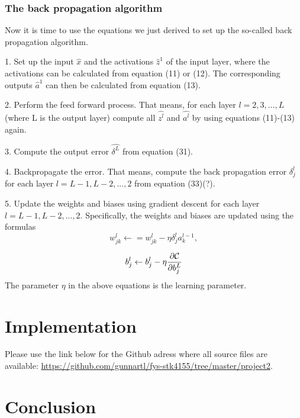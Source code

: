 \documentclass[a4paper,12pt]{article}
\begin{document}
\subsubsection{The back propagation algorithm}
Now it is time to use the equations we just derived to set up the so-called back propagation algorithm.\newline

1. Set up the input $\hat{x}$ and the activations $\hat{z}^1$ of the input layer, where the activations can be calculated from equation (11) or (12). The corresponding outputs $\hat{a}^1$ can then be calculated from equation (13).\newline 

2. Perform the feed forward process. That means, for each layer $l = 2, 3,..., L$ (where L is the output layer) compute all $\hat{z^l}$ and $\hat{a^l}$ by using equations (11)-(13) again.\newline

3. Compute the output error $\hat{\delta^L}$ from equation (31).\newline

4. Backpropagate the error. That means, compute the back propagation error $\delta_j^l$ for each layer $l = L-1, L-2,..., 2$ from equation (33)(?).\newline

5. Update the weights and biases using gradient descent for each layer $l=L-1, L-2,..., 2$. Specifically, the weights and biases are updated using the formulas
\begin{equation}
    w_{jk}^l\leftarrow  = w_{jk}^l- \eta \delta_j^la_k^{l-1},
\end{equation}

\begin{equation}
    b_j^l \leftarrow b_j^l-\eta \frac{\partial {\cal C}}{\partial b_j^L}
\end{equation}
The parameter $\eta$ in the above equations is the learning parameter.

\section{Implementation}
Please use the link below for the Github adress where all source files are available:\newline
\href{https://github.com/gunnartl/fys-stk4155/tree/master/project2}{https://github.com/gunnartl/fys-stk4155/tree/master/project2}.

\section{Conclusion}
\end{document}
